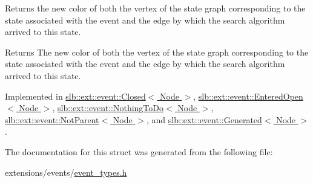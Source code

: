 Returns the new color of both the vertex of the state graph corresponding to the state associated with the event and the edge by which the search algorithm arrived to this state. 

\begin{DoxyReturn}{Returns}
The new color of both the vertex of the state graph corresponding to the state associated with the event and the edge by which the search algorithm arrived to this state. 
\end{DoxyReturn}


Implemented in \hyperlink{structslb_1_1ext_1_1event_1_1Closed_a481066c0af982217bc6de618cfe48ee5}{slb\+::ext\+::event\+::\+Closed$<$ Node $>$}, \hyperlink{structslb_1_1ext_1_1event_1_1EnteredOpen_ae9d3efea90ef2050c58f5744ade0d645}{slb\+::ext\+::event\+::\+Entered\+Open$<$ Node $>$}, \hyperlink{structslb_1_1ext_1_1event_1_1NothingToDo_af5ce8c541cfb24f4d7619d09e32290fd}{slb\+::ext\+::event\+::\+Nothing\+To\+Do$<$ Node $>$}, \hyperlink{structslb_1_1ext_1_1event_1_1NotParent_a7ff4fd7c62c5a56ee366565c0354f06b}{slb\+::ext\+::event\+::\+Not\+Parent$<$ Node $>$}, and \hyperlink{structslb_1_1ext_1_1event_1_1Generated_ae7d0033ee8badedc3057c363ecd00650}{slb\+::ext\+::event\+::\+Generated$<$ Node $>$}.



The documentation for this struct was generated from the following file\+:\begin{DoxyCompactItemize}
\item 
extensions/events/\hyperlink{event__types_8h}{event\+\_\+types.\+h}\end{DoxyCompactItemize}
